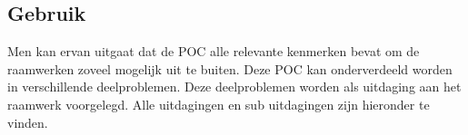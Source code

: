 
\subsection{Gebruik}
\label{sec:vergelijking-gebruik}

Men kan ervan uitgaat dat de POC alle relevante kenmerken bevat om de raamwerken zoveel mogelijk uit te buiten. 
Deze POC kan onderverdeeld worden in verschillende deelproblemen.
Deze deelproblemen worden als uitdaging aan het raamwerk voorgelegd.
Alle uitdagingen en sub uitdagingen zijn hieronder te vinden.

